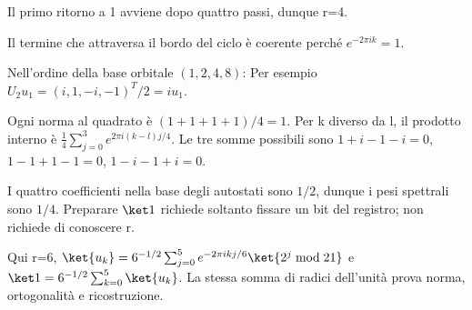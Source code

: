\ExSolution


Il primo ritorno a 1 avviene dopo quattro passi, dunque r=4.


Il termine che attraversa il bordo del ciclo è coerente perché \(e^{-2\pi ik}=1\).


Nell’ordine della base orbitale \((1,2,4,8)\):
Per esempio \(U_2u_1=(i,1,-i,-1)^T/2=i u_1\).


Ogni norma al quadrato è \((1+1+1+1)/4=1\). Per k diverso da l, il prodotto interno è \(\frac14\sum_{j=0}^3e^{2\pi i(k-l)j/4}\). Le tre somme possibili sono \(1+i-1-i=0\), \(1-1+1-1=0\), \(1-i-1+i=0\).


I quattro coefficienti nella base degli autostati sono \(1/2\), dunque i pesi spettrali sono \(1/4\). Preparare \(\ket1\) richiede soltanto fissare un bit del registro; non richiede di conoscere r.


Qui r=6, \(\ket{u_k}=6^{-1/2}\sum_{j=0}^5e^{-2\pi ikj/6}\ket{2^j\bmod21}\) e \(\ket1=6^{-1/2}\sum_{k=0}^5\ket{u_k}\). La stessa somma di radici dell’unità prova norma, ortogonalità e ricostruzione.

